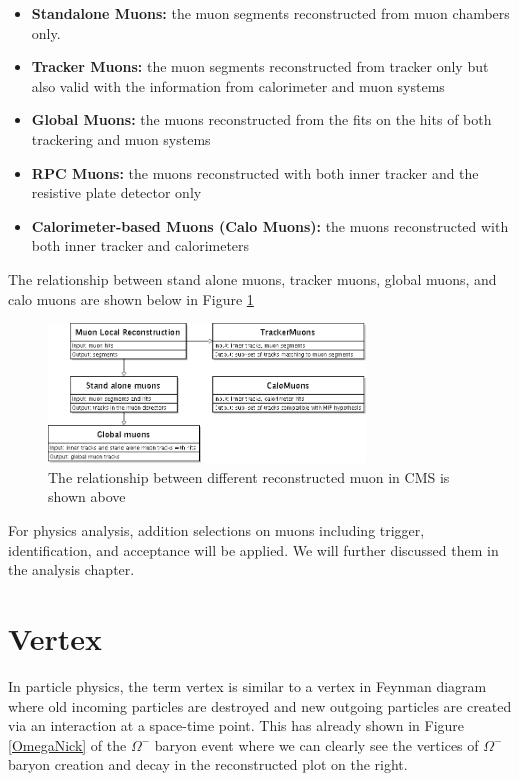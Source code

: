 \begin{itemize}
\item \textbf{Standalone Muons:} the muon segments reconstructed from muon chambers only.
\item \textbf{Tracker Muons:} the muon segments reconstructed from tracker only but also valid with the information from calorimeter and muon systems
\item \textbf{Global Muons:} the muons reconstructed from the fits on the hits of both trackering and muon systems
\item \textbf{RPC Muons:} the muons reconstructed with both inner tracker and the resistive plate detector only 
\item \textbf{Calorimeter-based Muons (Calo Muons):} the muons reconstructed with both inner tracker and calorimeters  
\end{itemize}

The relationship between stand alone muons, tracker muons, global muons, and calo muons are shown below in Figure \ref{MuonRel}

\begin{figure}[hbtp]
\begin{center}
\includegraphics[width=0.75\textwidth]{Figures/Chapter4/MuonRel}
\caption{The relationship between different reconstructed muon in CMS is shown above}
\label{MuonRel}
\end{center}
\end{figure} 

For physics analysis, addition selections on muons including trigger, identification, and acceptance will be applied. We will further discussed them in the analysis chapter.

\section{Vertex}

In particle physics, the term vertex is similar to a vertex in Feynman diagram where old incoming particles are destroyed and new outgoing particles are created via an interaction at a space-time point. This has already shown in Figure \ref{OmegaNick} of the $\Omega^-$ baryon event where we can clearly see the vertices of $\Omega^-$ baryon creation and decay in the reconstructed plot on the right. 

